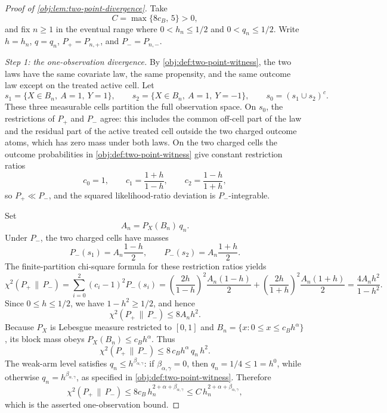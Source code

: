 \begin{proof}[Proof of \cref{obj:lem:two-point-divergence}]
Take
\[
C=\max\{8c_B,\,5\}>0,
\]
and fix \(n\ge1\) in the eventual range where \(0<h_n\le1/2\) and \(0<q_n\le1/2\).  Write \(h=h_n\), \(q=q_n\), \(P_+=P_{n,+}\), and \(P_-=P_{n,-}\).

\emph{Step 1: the one-observation divergence.}  By \cref{obj:def:two-point-witness}, the two laws have the same covariate law, the same propensity, and the same outcome law except on the treated active cell.  Let
\[
s_1=\{X\in B_n,\ A=1,\ Y=1\},
\qquad
s_2=\{X\in B_n,\ A=1,\ Y=-1\},
\qquad
s_0=(s_1\cup s_2)^c .
\]
These three measurable cells partition the full observation space.  On \(s_0\), the restrictions of \(P_+\) and \(P_-\) agree: this includes the common off-cell part of the law and the residual part of the active treated cell outside the two charged outcome atoms, which has zero mass under both laws.  On the two charged cells the outcome probabilities in \cref{obj:def:two-point-witness} give constant restriction ratios
\[
c_0=1,
\qquad
c_1=\frac{1+h}{1-h},
\qquad
c_2=\frac{1-h}{1+h},
\]
so \(P_+\ll P_-\), and the squared likelihood-ratio deviation is \(P_-\)-integrable.

Set
\[
A_n=P_X(B_n)\,q_n .
\]
Under \(P_-\), the two charged cells have masses
\[
P_-(s_1)=A_n\frac{1-h}{2},
\qquad
P_-(s_2)=A_n\frac{1+h}{2}.
\]
The finite-partition chi-square formula for these restriction ratios yields
\[
\chi^2(P_+\,\|\,P_-)
=
\sum_{i=0}^2(c_i-1)^2P_-(s_i)
=
\left(\frac{2h}{1-h}\right)^2\frac{A_n(1-h)}2
+
\left(\frac{2h}{1+h}\right)^2\frac{A_n(1+h)}2
=
\frac{4A_nh^2}{1-h^2}.
\]
Since \(0\le h\le1/2\), we have \(1-h^2\ge1/2\), and hence
\[
\chi^2(P_+\,\|\,P_-)
\le 8A_nh^2 .
\]
Because \(P_X\) is Lebesgue measure restricted to \([0,1]\) and \(B_n=\{x:0\le x\le c_Bh^\alpha\}\), its block mass obeys \(P_X(B_n)\le c_Bh^\alpha\).  Thus
\[
\chi^2(P_+\,\|\,P_-)
 \le 8\,c_Bh^\alpha\,q_n\,h^2 .
\]
The weak-arm level satisfies \(q_n\le h^{\beta_{\alpha,\gamma}}\): if \(\beta_{\alpha,\gamma}=0\), then \(q_n=1/4\le1=h^0\), while otherwise \(q_n=h^{\beta_{\alpha,\gamma}}\), as specified in \cref{obj:def:two-point-witness}.  Therefore
\[
\chi^2(P_+\,\|\,P_-)
 \le 8c_B\,h_n^{2+\alpha+\beta_{\alpha,\gamma}}
 \le C\,h_n^{2+\alpha+\beta_{\alpha,\gamma}},
\]
which is the asserted one-observation bound. %


\end{proof}
